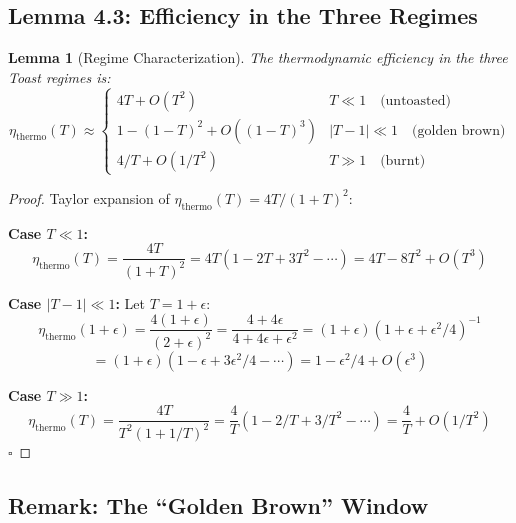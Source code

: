 \documentclass[11pt,a4paper]{article}
\newtheorem{lemma}[theorem]{Lemma}
\begin{document}
\subsection{Lemma 4.3: Efficiency in the Three Regimes}

\begin{lemma}[Regime Characterization]
The thermodynamic efficiency in the three Toast regimes is:
\begin{equation}
\eta_{\text{thermo}}(T) \approx \begin{cases}
4T + O(T^2) & T \ll 1 \quad \text{(untoasted)} \\
1 - (1-T)^2 + O((1-T)^3) & |T - 1| \ll 1 \quad \text{(golden brown)} \\
4/T + O(1/T^2) & T \gg 1 \quad \text{(burnt)}
\end{cases}
\end{equation}
\end{lemma}

\begin{proof}
Taylor expansion of $\eta_{\text{thermo}}(T) = 4T/(1+T)^2$:

\textbf{Case $T \ll 1$:}
\begin{equation}
\eta_{\text{thermo}}(T) = \frac{4T}{(1+T)^2} = 4T(1 - 2T + 3T^2 - \cdots) = 4T - 8T^2 + O(T^3)
\end{equation}

\textbf{Case $|T - 1| \ll 1$:}
Let $T = 1 + \epsilon$:
\begin{equation}
\eta_{\text{thermo}}(1+\epsilon) = \frac{4(1+\epsilon)}{(2+\epsilon)^2} = \frac{4 + 4\epsilon}{4 + 4\epsilon + \epsilon^2} = (1+\epsilon)(1 + \epsilon + \epsilon^2/4)^{-1}
\end{equation}
\begin{equation}
= (1+\epsilon)(1 - \epsilon + 3\epsilon^2/4 - \cdots) = 1 - \epsilon^2/4 + O(\epsilon^3)
\end{equation}

\textbf{Case $T \gg 1$:}
\begin{equation}
\eta_{\text{thermo}}(T) = \frac{4T}{T^2(1 + 1/T)^2} = \frac{4}{T}(1 - 2/T + 3/T^2 - \cdots) = \frac{4}{T} + O(1/T^2)
\end{equation}
\hfill $\square$
\end{proof}

\subsection{Remark: The ``Golden Brown'' Window}
\end{document}

